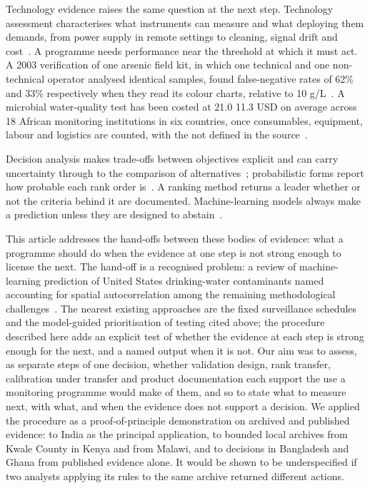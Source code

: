 \documentclass[10pt,letterpaper]{article}
\begin{document}
Technology evidence raises the same question at the next step. Technology assessment characterises what instruments can measure and what deploying them demands, from power supply in remote settings to cleaning, signal drift and cost~\cite{Andres2018}. A programme needs performance near the threshold at which it must act. A 2003 verification of one arsenic field kit, in which one technical and one non-technical operator analysed identical samples, found false-negative rates of 62\% and 33\% respectively when they read its colour charts, relative to 10 \textmu{}g/L~\cite{EPA-ETV-QuickLowRangeII-2003}. A microbial water-quality test has been costed at 21.0 \textpm{} 11.3 USD on average across 18 African monitoring institutions in six countries, once consumables, equipment, labour and logistics are counted, with the \textpm{} not defined in the source~\cite{Delaire2017}.

Decision analysis makes trade-offs between objectives explicit and can carry uncertainty through to the comparison of alternatives~\cite{Schuwirth2018}; probabilistic forms report how probable each rank order is~\cite{Broekhuizen2015}. A ranking method returns a leader whether or not the criteria behind it are documented. Machine-learning models always make a prediction unless they are designed to abstain~\cite{Hendrickx2024}.

This article addresses the hand-offs between these bodies of evidence: what a programme should do when the evidence at one step is not strong enough to license the next. The hand-off is a recognised problem: a review of machine-learning prediction of United States drinking-water contaminants named accounting for spatial autocorrelation among the remaining methodological challenges~\cite{Hu2023}. The nearest existing approaches are the fixed surveillance schedules and the model-guided prioritisation of testing cited above; the procedure described here adds an explicit test of whether the evidence at each step is strong enough for the next, and a named output when it is not. Our aim was to assess, as separate steps of one decision, whether validation design, rank transfer, calibration under transfer and product documentation each support the use a monitoring programme would make of them, and so to state what to measure next, with what, and when the evidence does not support a decision. We applied the procedure as a proof-of-principle demonstration on archived and published evidence: to India as the principal application, to bounded local archives from Kwale County in Kenya and from Malawi, and to decisions in Bangladesh and Ghana from published evidence alone. It would be shown to be underspecified if two analysts applying its rules to the same archive returned different actions.
\end{document}
